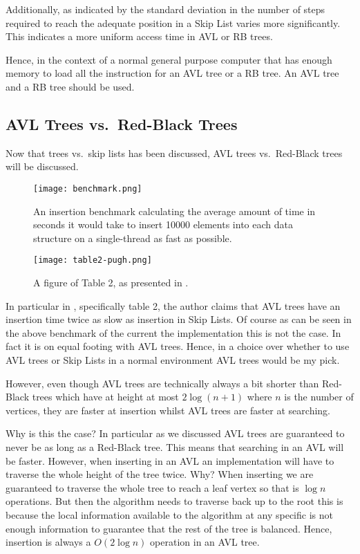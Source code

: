 \documentclass[article]{uom-coursework}
\begin{document}
Additionally, as indicated by the standard deviation in the
number of steps required to reach the adequate position in a
Skip List varies more significantly. This indicates a more
uniform access time in AVL or RB trees.

Hence, in the context of a normal general purpose
computer that has enough memory to load all the instruction
for an AVL tree or a RB tree. An AVL tree and a
RB tree should be used.

\subsection{AVL Trees vs.\ Red-Black Trees}

Now that trees vs.\ skip lists has been discussed, AVL trees
vs.\ Red-Black trees will be discussed.

\begin{figure}[H]
\centering
\texttt{[image: benchmark.png]}
\caption{An insertion benchmark calculating the average amount of time
in seconds it would take to insert 10000 elements into each
data structure on a single-thread as fast as possible.}
\label{fig:test9}
\end{figure}

\begin{figure}[H]
\centering
\texttt{[image: table2-pugh.png]}
\caption{A figure of Table 2, as presented in \textcite{pugh90}.}
\label{fig:test9}
\end{figure}


In particular in \textcite{pugh90}, specifically table 2,
the author claims that AVL trees have an insertion time
twice as slow as insertion in Skip Lists. Of course
as can be seen in the above benchmark of the current
the implementation this is not the case. In fact
it is on equal footing with AVL trees. Hence,
in a choice over whether to use AVL trees or Skip Lists
in a normal environment AVL trees would be my pick.

However, even though AVL trees are technically always a bit
shorter than Red-Black trees which have at height at most $2
\log (n + 1)$ where $n$ is the number of vertices, they are
faster at insertion whilst AVL trees are faster at searching.

Why is this the case? In particular as we discussed AVL trees
are guaranteed to never be as long as a Red-Black tree. This
means that searching in an AVL will be faster. However,
when inserting in an AVL an implementation will have to traverse
the whole height of the tree twice. Why? When inserting
we are guaranteed to traverse the whole tree to reach a leaf
vertex so that is $\log n$ operations. But then
the algorithm needs to traverse back up to the root
this is because the local information available to the algorithm
at any specific is not enough information to guarantee
that the rest of the tree is balanced. Hence,
insertion is always a $O(2 \log n)$ operation in an AVL tree.
\end{document}
